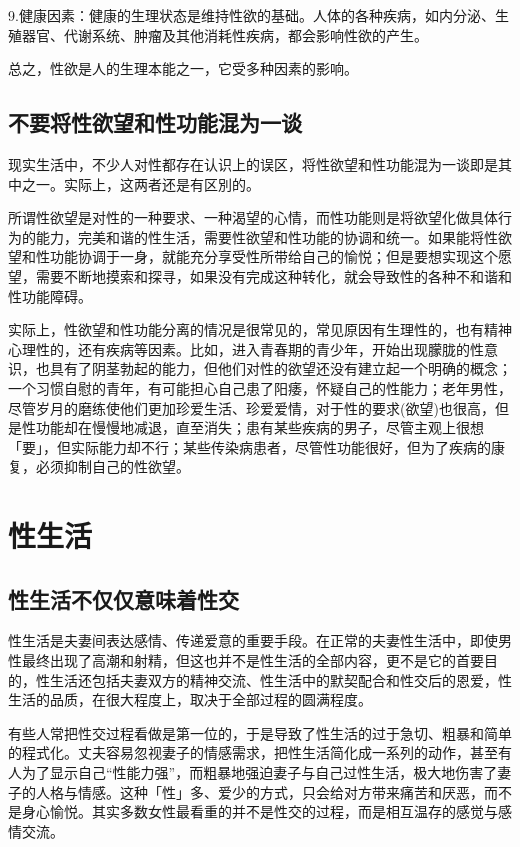 \documentclass[12pt,UTF8]{ctexbook}
\begin{document}
9.健康因素：健康的生理状态是维持性欲的基础。人体的各种疾病，如内分泌、生殖器官、代谢系统、肿瘤及其他消耗性疾病，都会影响性欲的产生。

总之，性欲是人的生理本能之一，它受多种因素的影响。

\chapter{不要将性欲望和性功能混为一谈}

现实生活中，不少人对性都存在认识上的误区，将性欲望和性功能混为一谈即是其中之一。实际上，这两者还是有区別的。

所谓性欲望是对性的一种要求、一种渴望的心情，而性功能则是将欲望化做具体行为的能力，完美和谐的性生活，需要性欲望和性功能的协调和统一。如果能将性欲望和性功能协调于一身，就能充分享受性所带给自己的愉悦；但是要想实现这个愿望，需要不断地摸索和探寻，如果没有完成这种转化，就会导致性的各种不和谐和性功能障碍。

实际上，性欲望和性功能分离的情况是很常见的，常见原因有生理性的，也有精神心理性的，还有疾病等因素。比如，进入青春期的青少年，开始出现朦胧的性意识，也具有了阴茎勃起的能力，但他们对性的欲望还没有建立起一个明确的概念；一个习惯自慰的青年，有可能担心自己患了阳痿，怀疑自己的性能力；老年男性，尽管岁月的磨练使他们更加珍爱生活、珍爱爱情，对于性的要求(欲望)也很高，但是性功能却在慢慢地减退，直至消失；患有某些疾病的男子，尽管主观上很想「要」，但实际能力却不行；某些传染病患者，尽管性功能很好，但为了疾病的康复，必须抑制自己的性欲望。

\part{性生活}

\chapter{性生活不仅仅意味着性交}

性生活是夫妻间表达感情、传递爱意的重要手段。在正常的夫妻性生活中，即使男性最终出现了高潮和射精，但这也并不是性生活的全部内容，更不是它的首要目的，性生活还包括夫妻双方的精神交流、性生活中的默契配合和性交后的恩爱，性生活的品质，在很大程度上，取决于全部过程的圆满程度。

有些人常把性交过程看做是第一位的，于是导致了性生活的过于急切、粗暴和简单的程式化。丈夫容易忽视妻子的情感需求，把性生活简化成一系列的动作，甚至有人为了显示自己“性能力强”，而粗暴地强迫妻子与自己过性生活，极大地伤害了妻子的人格与情感。这种「性」多、爱少的方式，只会给对方带来痛苦和厌恶，而不是身心愉悦。其实多数女性最看重的并不是性交的过程，而是相互温存的感觉与感情交流。
\end{document}
